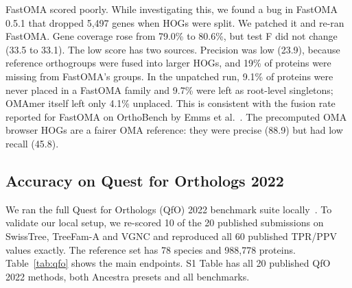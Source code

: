 FastOMA scored poorly. While investigating this, we found a bug in FastOMA 0.5.1 that dropped 5,497 genes when HOGs were split. We patched it and re-ran FastOMA. Gene coverage rose from 79.0\% to 80.6\%, but test F did not change (33.5 to 33.1). The low score has two sources. Precision was low (23.9), because reference orthogroups were fused into larger HOGs, and 19\% of proteins were missing from FastOMA's groups. In the unpatched run, 9.1\% of proteins were never placed in a FastOMA family and 9.7\% were left as root-level singletons; OMAmer itself left only 4.1\% unplaced. This is consistent with the fusion rate reported for FastOMA on OrthoBench by Emms et al.~\cite{emms2026orthofinder3}. The precomputed OMA browser HOGs are a fairer OMA reference: they were precise (88.9) but had low recall (45.8).

\subsection*{Accuracy on Quest for Orthologs 2022}
We ran the full Quest for Orthologs (QfO) 2022 benchmark suite locally~\cite{altenhoff2024qfo}. To validate our local setup, we re-scored 10 of the 20 published submissions on SwissTree, TreeFam-A and VGNC and reproduced all 60 published TPR/PPV values exactly. The reference set has 78 species and 988,778 proteins. Table~\ref{tab:qfo} shows the main endpoints. S1 Table has all 20 published QfO 2022 methods, both Ancestra presets and all benchmarks.

